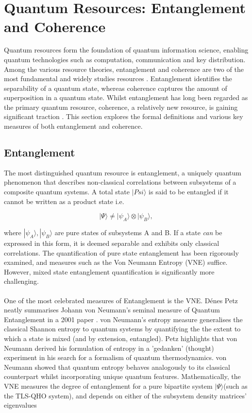 \documentclass[12pt,a4paper]{article}
\begin{document}
\newpage

\section{Quantum Resources: Entanglement and Coherence} \label{sec_QRes}

Quantum resources form the foundation of quantum information science, enabling quantum technologies such as computation, communication and key distribution. Among the various resource theories, entanglement and coherence are two of the most fundamental and widely studies resources \cite{CohEnt2019-QRT_def}. Entanglement identifies the separability of a quantum state, whereas coherence captures the amount of superposition in a quantum state. Whilst entanglement has long been regarded as the primary quantum resource, coherence, a relatively new resource, is gaining significant traction \cite{CohEnt2019-QRT_def}. This section explores the formal definitions and various key measures of both entanglement and coherence. 

\subsection{Entanglement} \label{subsec_ent}

The most distinguished quantum resource is entanglement, a uniquely quantum phenomenon that describes non-classical correlations between subsystems of a composite quantum systems. A total state $|Psi\rangle$ is said to be entangled if it cannot be written as a product state i.e.

\begin{equation}
    |\Psi\rangle \neq |\psi_A\rangle \otimes |\psi_B\rangle,
\end{equation}

where $|\psi_A\rangle, |\psi_B\rangle$ are pure states of subsystems A and B. If a state \textit{can} be expressed in this form, it is deemed separable and exhibits only classical correlations. The quantification of pure state entanglement has been rigorously examined, and measures such as the Von Neumann Entropy (VNE) suffice. However, mixed state entanglement quantification is significantly more challenging. \\
\\
One of the most celebrated measures of Entanglement is the VNE. D\'enes Petz neatly summarises Johann von Neumann's seminal measure of Quantum Entanglement in a 2001 paper \cite{Entanglement2001-VNE_Definition}. von Neumann's entropy measure generalises the classical Shannon entropy to quantum systems by quantifying the the extent to which a state is mixed (and by extension, entangled). Petz highlights that von Neumann derived his formulation of entropy in a 'gedanken' (thought) experiment in his search for a formalism of quantum thermodynamics. von Neumann showed that quantum entropy behaves analogously to its classical counterpart whilst incorporating unique quantum features. Mathematically, the VNE \cite{Entanglement2001-VNE_Definition} measures the degree of entanglement for a pure bipartite system $|\Psi\rangle$(such as the TLS-QHO system), and depends on either of the subsystem density matrices' eigenvalues
\end{document}

